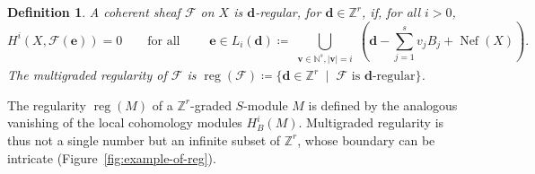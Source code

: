 \documentclass[11pt,reqno]{amsart}
\newtheorem{defn}[lemma]{Definition}
\theoremstyle{remark}
\newcommand{\reg}{\operatorname{reg}}
\newcommand{\Nef}{\operatorname{Nef}}
\newcommand{\dd}{\mathbf{d}}
\newcommand{\ee}{\mathbf{e}}
\newcommand{\vv}{\mathbf{v}}
\newcommand{\NN}{\mathbb{N}}
\newcommand{\ZZ}{\mathbb{Z}}
\newcommand{\cF}{\mathcal{F}}
\begin{document}
\begin{defn}\cite[Def.~6.6]{maclaganSmith04}\label{def:mg-reg}
A coherent sheaf $\cF$ on $X$ is \emph{$\dd$-regular}, for $\dd\in\ZZ^r$, if, for all $i>0$,
\[
H^i(X, \cF(\ee))=0 \qquad \text{for all } \qquad \ee \in L_{i}(\dd) \coloneqq \bigcup_{\substack{\vv\in \NN^s, |\vv|=i}} \left(\dd-\sum_{j=1}^{s}v_{j}B_j + \Nef(X)\right).
\]
The \emph{multigraded regularity} of $\cF$ is $\reg(\cF)\coloneqq \{\dd\in \ZZ^r \;\; | \;\; \text{$\cF$ is $\dd$-regular}\}$.
\end{defn}

The regularity $\reg(M)$ of a $\ZZ^r$-graded $S$-module $M$ is defined by the analogous vanishing of the local cohomology modules $H^i_B(M)$. Multigraded regularity is thus not a single number but an infinite subset of $\ZZ^{r}$, whose boundary can be intricate (Figure~\ref{fig:example-of-reg}).
\end{document}
